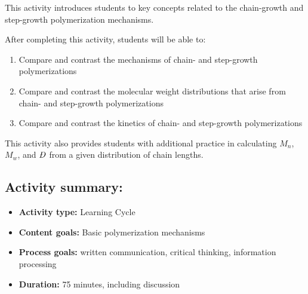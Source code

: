 %
%
%
%

\renewcommand{\figpath}{content/intro/chain-and-step/figs}
\renewcommand{\labelbase}{chain-and-step}

\begin{activity}

\begin{instructornotes}

	This activity introduces students to key concepts related to the chain-growth and step-growth polymerization mechanisms.
	
	After completing this activity, students will be able to:
			\begin{enumerate}
				\item Compare and contrast the mechanisms of chain- and step-growth polymerizations
				\item Compare and contrast the molecular weight distributions that arise from chain- and step-growth polymerizations
				\item Compare and contrast the kinetics of chain- and step-growth polymerizations
			\end{enumerate}
			
	This activity also provides students with additional practice in calculating $M_n$, $M_w$, and $\PDImath$ from a given distribution of chain lengths.
			
	\subsection*{Activity summary:}
	\begin{itemize}
		\item \textbf{Activity type:} Learning Cycle
		\item \textbf{Content goals:} Basic polymerization mechanisms
		\item \textbf{Process goals:} %
			written communication, critical thinking, information processing
		\item \textbf{Duration:} 75 minutes, including discussion 
		

\end{itemize}
\end{instructornotes}
\end{activity}
